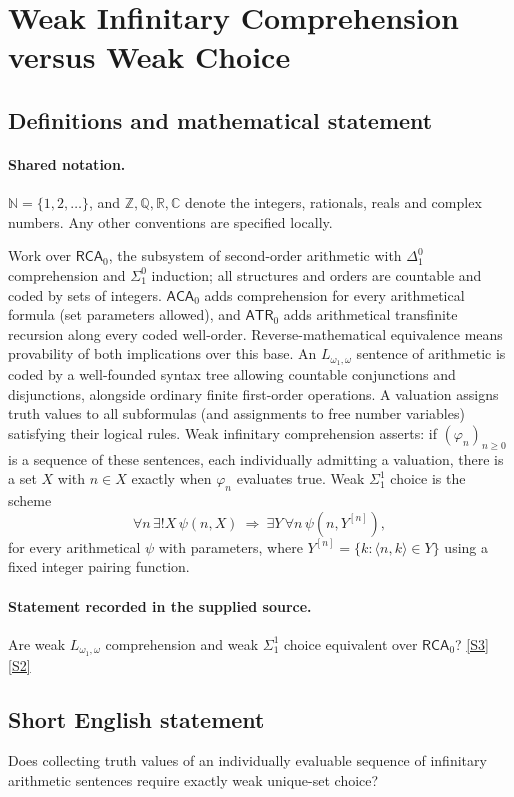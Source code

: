 \documentclass[11pt]{article}
\newcommand{\sref}[2]{\hyperlink{source:#1:#2}{[S#2]}}
\begin{document}
\section{Weak Infinitary Comprehension versus Weak Choice}\label{statement}

\subsection{Definitions and mathematical statement}

\paragraph{Shared notation.}$\mathbb N=\{1,2,\ldots\}$, and $\mathbb Z,\mathbb Q,\mathbb R,\mathbb C$ denote the integers, rationals, reals and complex numbers. Any other conventions are specified locally.


Work over $\mathsf{RCA}_0$, the subsystem of second-order arithmetic with $\Delta^0_1$ comprehension and $\Sigma^0_1$ induction; all structures and orders are countable and coded by sets of integers. $\mathsf{ACA}_0$ adds comprehension for every arithmetical formula (set parameters allowed), and $\mathsf{ATR}_0$ adds arithmetical transfinite recursion along every coded well-order. Reverse-mathematical equivalence means provability of both implications over this base. An $L_{\omega_1,\omega}$ sentence of arithmetic is coded by a well-founded syntax tree allowing countable conjunctions and disjunctions, alongside ordinary finite first-order operations. A valuation assigns truth values to all subformulas (and assignments to free number variables) satisfying their logical rules. Weak infinitary comprehension asserts: if $(\varphi_n)_{n\ge0}$ is a sequence of these sentences, each individually admitting a valuation, there is a set $X$ with $n\in X$ exactly when $\varphi_n$ evaluates true. Weak $\Sigma^1_1$ choice is the scheme \[\forall n\,\exists!X\,\psi(n,X)\ \Longrightarrow\ \exists Y\,\forall n\,\psi(n,Y^{[n]}),\] for every arithmetical $\psi$ with parameters, where $Y^{[n]}=\{k:\langle n,k\rangle\in Y\}$ using a fixed integer pairing function.
\paragraph{Statement recorded in the supplied source.}
Are weak $L_{\omega_1,\omega}$ comprehension and weak $\Sigma^1_1$ choice equivalent over $\mathsf{RCA}_0$? \sref{statement}{3} \sref{statement}{2}
\subsection{Short English statement}
Does collecting truth values of an individually evaluable sequence of infinitary arithmetic sentences require exactly weak unique-set choice?
\end{document}
